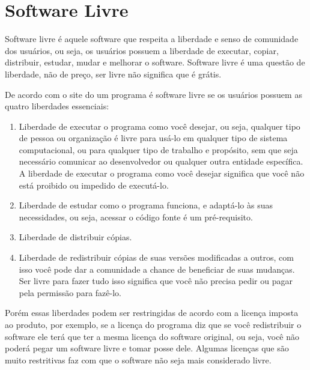\section{Software Livre}

Software livre é aquele software que respeita a liberdade e senso de comunidade dos usuários, ou seja, os usuários possuem a liberdade de executar, copiar, distribuir, estudar, mudar e melhorar o software. Software livre é uma questão de liberdade, não de preço, ser livre não significa que é grátis. \cite{gnu}

De acordo com o site do \cite{gnu} um programa é software livre se os usuários possuem as quatro liberdades essenciais:

\begin{enumerate}
  \item Liberdade de executar o programa como você desejar, ou seja, qualquer tipo de pessoa ou organização é livre para usá-lo em qualquer tipo de sistema computacional, ou para qualquer tipo de trabalho e propósito, sem que seja necessário comunicar ao desenvolvedor ou qualquer outra entidade específica. A liberdade de executar o programa como você desejar significa que você não está proibido ou impedido de executá-lo.
  \item Liberdade de estudar como o programa funciona, e adaptá-lo às suas necessidades, ou seja, acessar o código fonte é um pré-requisito.
  \item Liberdade de distribuir cópias.
  \item Liberdade de redistribuir cópias de suas versões modificadas a outros, com isso você pode dar a comunidade a chance de beneficiar de suas mudanças. Ser livre para fazer tudo isso significa que você não precisa pedir ou pagar pela permissão para fazê-lo.
\end{enumerate}

Porém essas liberdades podem ser restringidas de acordo com a licença imposta ao produto, por exemplo, se a licença do programa diz que se você redistribuir o software ele terá que ter a mesma licença do software original, ou seja, você não poderá pegar um software livre e tomar posse dele. Algumas licenças que são muito restritivas faz com que o software não seja mais considerado livre.
